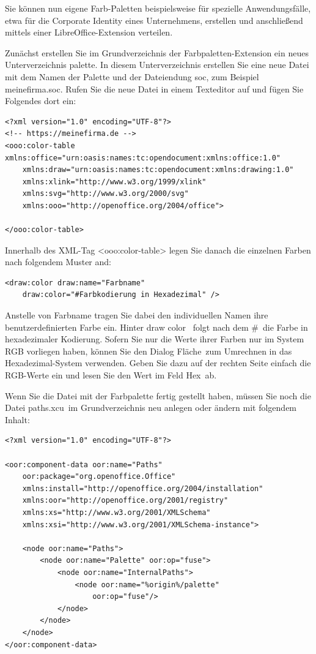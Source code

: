 \documentclass[a4paper,10pt,pagesize,titlepage]{scrbook}
\begin{document}
Sie können nun eigene Farb-Paletten beispielsweise für spezielle Anwendungsfälle, etwa für die Corporate Identity eines Unternehmens, erstellen und anschließend mittels einer LibreOffice-Extension verteilen.

Zunächst erstellen Sie im Grundverzeichnis der Farbpaletten-Extension ein neues Unterverzeichnis \glqq palette\grqq. In diesem Unterverzeichnis erstellen Sie eine neue Datei mit dem Namen der Palette und der Dateiendung \glqq soc\grqq, zum Beispiel \glqq meinefirma.soc\grqq. Rufen Sie die neue Datei in einem Texteditor auf und fügen Sie Folgendes dort ein:

\begin{lstlisting}
<?xml version="1.0" encoding="UTF-8"?>
<!-- https://meinefirma.de -->
<ooo:color-table xmlns:office="urn:oasis:names:tc:opendocument:xmlns:office:1.0"
    xmlns:draw="urn:oasis:names:tc:opendocument:xmlns:drawing:1.0"
    xmlns:xlink="http://www.w3.org/1999/xlink"
    xmlns:svg="http://www.w3.org/2000/svg"
    xmlns:ooo="http://openoffice.org/2004/office">
    
</ooo:color-table>
\end{lstlisting}

Innerhalb des XML-Tag <ooo:color-table> legen Sie danach die einzelnen Farben nach folgendem Muster and:

\begin{lstlisting}
<draw:color draw:name="Farbname" 
    draw:color="#Farbkodierung in Hexadezimal" />
\end{lstlisting}

Anstelle von Farbname tragen Sie dabei den individuellen Namen ihre benutzerdefinierten Farbe ein. Hinter \glqq draw color\grqq~ folgt nach dem \glqq \#\grqq~die Farbe in hexadezimaler Kodierung. Sofern Sie nur die Werte ihrer Farben nur im System RGB vorliegen haben, können Sie den Dialog \glqq Fläche\grqq~zum Umrechnen in das Hexadezimal-System verwenden. Geben Sie dazu auf der rechten Seite einfach die RGB-Werte ein und lesen Sie den Wert im Feld \glqq Hex\grqq~ab.

Wenn Sie die Datei mit der Farbpalette fertig gestellt haben, müssen Sie noch die Datei \glqq paths.xcu\grqq~im Grundverzeichnis neu anlegen oder ändern mit folgendem Inhalt:


\begin{lstlisting}
<?xml version="1.0" encoding="UTF-8"?>

<oor:component-data oor:name="Paths" 
    oor:package="org.openoffice.Office" 
    xmlns:install="http://openoffice.org/2004/installation" 
    xmlns:oor="http://openoffice.org/2001/registry"
    xmlns:xs="http://www.w3.org/2001/XMLSchema" 
    xmlns:xsi="http://www.w3.org/2001/XMLSchema-instance">

    <node oor:name="Paths">
        <node oor:name="Palette" oor:op="fuse">
            <node oor:name="InternalPaths">
                <node oor:name="%origin%/palette" 
                    oor:op="fuse"/>
            </node>
        </node>
    </node>
</oor:component-data>
\end{lstlisting}
\end{document}

